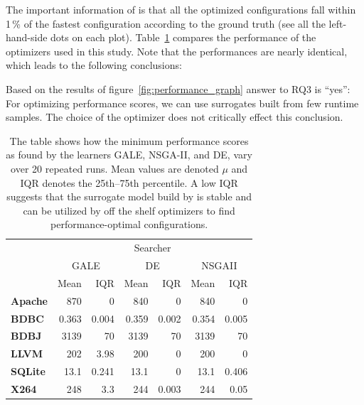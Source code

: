 The important information of  is that all the optimized configurations fall within 1\,\% of the fastest
configuration according to the ground truth (see all the left-hand-side dots on each plot). Table~\ref{fig:external_validity} compares the performance of the optimizers
used in this study. Note that the performances are nearly identical, which leads to the following conclusions:

\begin{myshadowbox}
Based on the results of figure~\ref{fig:performance_graph} answer to RQ3 is ``yes'': For optimizing performance scores, we can use surrogates built from few runtime samples. The choice of the optimizer does not critically effect this conclusion.
\end{myshadowbox}


\begin{table}[tbh]
\centering
\caption{The table shows how the minimum performance scores as found by the learners GALE, NSGA-II, and DE, vary over 20 repeated
runs. Mean values are denoted $\mu$ and IQR denotes the 25th--75th percentile. A low IQR suggests that the surrogate model build by \what is stable and can be utilized by off the shelf optimizers to find performance-optimal configurations.
}
\label{fig:external_validity}
\vspace{2ex}
\begin{tabular}{lrrrrrr}
\toprule
\multirow{3}{*}{} & \multicolumn{6}{c}{Searcher}                                                                       \\ \cmidrule{2-7} 
                                  & \multicolumn{2}{c}{GALE} & \multicolumn{2}{c}{DE} & \multicolumn{2}{c}{NSGAII} \\ \cmidrule{2-7} 
                                  & Mean    & IQR    & Mean   & IQR   & Mean     & IQR     \\ \midrule
\textbf{Apache}                   & 870              & 0               & 840             & 0              & 840               & 0                \\ 
\textbf{BDBC}                     & 0.363            & 0.004           & 0.359           & 0.002          & 0.354             & 0.005            \\ 
\textbf{BDBJ}                     & 3139             & 70              & 3139            & 70             & 3139              & 70               \\ 
\textbf{LLVM}                     & 202              & 3.98            & 200             & 0              & 200               & 0                \\ 
\textbf{SQLite}                   & 13.1             & 0.241           & 13.1            & 0              & 13.1              & 0.406            \\ 
\textbf{X264}                     & 248              & 3.3             & 244             & 0.003          & 244               & 0.05             \\ \bottomrule
\end{tabular}
\end{table}

